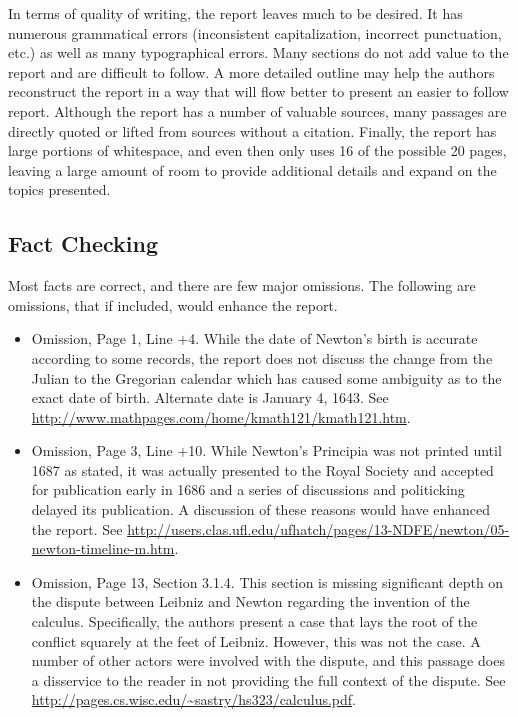 \documentclass[11pt]{article}
\begin{document}
In terms of quality of writing, the report leaves much to be desired. It has numerous grammatical errors (inconsistent capitalization, incorrect punctuation, etc.) as well as many typographical errors. Many sections do not add value to the report and are difficult to follow. A more detailed outline may help the authors reconstruct the report in a way that will flow better to present an easier to follow report. Although the report has a number of valuable sources, many passages are directly quoted or lifted from sources without a citation. Finally, the report has large portions of whitespace, and even then only uses 16 of the possible 20 pages, leaving a large amount of room to provide additional details and expand on the topics presented.

\newpage
\subsection*{Fact Checking}
Most facts are correct, and there are few major omissions. The following are omissions, that if included, would enhance the report.
\begin{itemize}
\item Omission, Page 1, Line +4. While the date of Newton's birth is accurate according to some records, the report does not discuss the change from the Julian to the Gregorian calendar which has caused some ambiguity as to the exact date of birth. Alternate date is January 4, 1643. See \url{http://www.mathpages.com/home/kmath121/kmath121.htm}.

\item Omission, Page 3, Line +10. While Newton's Principia was not printed until 1687 as stated, it was actually presented to the Royal Society and accepted for publication early in 1686 and a series of discussions and politicking delayed its publication. A discussion of these reasons would have enhanced the report. See \url{http://users.clas.ufl.edu/ufhatch/pages/13-NDFE/newton/05-newton-timeline-m.htm}.

\item Omission, Page 13, Section 3.1.4. This section is missing significant depth on the dispute between Leibniz and Newton regarding the invention of the calculus. Specifically, the authors present a case that lays the root of the conflict squarely at the feet of Leibniz. However, this was not the case. A number of other actors were involved with the dispute, and this passage does a disservice to the reader in not providing the full context of the dispute. See \url{http://pages.cs.wisc.edu/~sastry/hs323/calculus.pdf}.
\end{itemize}
\end{document}
